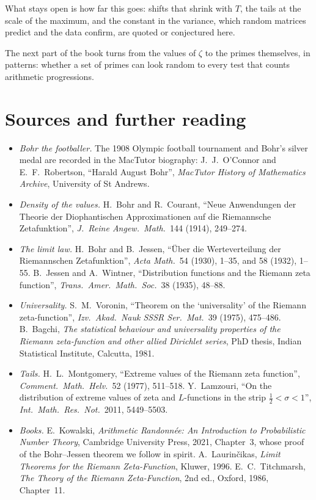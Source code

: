 What stays open is how far this goes: shifts that shrink with $T$, the tails at the scale of the maximum, and the constant in the variance, which random matrices predict and the data confirm, are quoted or conjectured here.

The next part of the book turns from the values of $\zeta$ to the primes themselves, in patterns: whether a set of primes can look random to every test that counts arithmetic progressions.

\section*{Sources and further reading}

\begin{itemize}
\item \emph{Bohr the footballer.} The 1908 Olympic football tournament and Bohr's silver medal are recorded in the MacTutor biography: J.~J.~O'Connor and E.~F.~Robertson, ``Harald August Bohr'', \emph{MacTutor History of Mathematics Archive}, University of St Andrews.
\item \emph{Density of the values.} H.~Bohr and R.~Courant, ``Neue Anwendungen der Theorie der Diophantischen Approximationen auf die Riemannsche Zetafunktion'', \emph{J.\ Reine Angew.\ Math.}\ 144 (1914), 249--274.
\item \emph{The limit law.} H.~Bohr and B.~Jessen, ``Über die Werteverteilung der Riemannschen Zetafunktion'', \emph{Acta Math.}\ 54 (1930), 1--35, and 58 (1932), 1--55. B.~Jessen and A.~Wintner, ``Distribution functions and the Riemann zeta function'', \emph{Trans.\ Amer.\ Math.\ Soc.}\ 38 (1935), 48--88.
\item \emph{Universality.} S.~M.~Voronin, ``Theorem on the `universality' of the Riemann zeta-function'', \emph{Izv.\ Akad.\ Nauk SSSR Ser.\ Mat.}\ 39 (1975), 475--486. B.~Bagchi, \emph{The statistical behaviour and universality properties of the Riemann zeta-function and other allied Dirichlet series}, PhD thesis, Indian Statistical Institute, Calcutta, 1981.
\item \emph{Tails.} H.~L.~Montgomery, ``Extreme values of the Riemann zeta function'', \emph{Comment.\ Math.\ Helv.}\ 52 (1977), 511--518. Y.~Lamzouri, ``On the distribution of extreme values of zeta and $L$-functions in the strip $\frac12<\sigma<1$'', \emph{Int.\ Math.\ Res.\ Not.}\ 2011, 5449--5503.
\item \emph{Books.} E.~Kowalski, \emph{Arithmetic Randonnée: An Introduction to Probabilistic Number Theory}, Cambridge University Press, 2021, Chapter~3, whose proof of the Bohr--Jessen theorem we follow in spirit. A.~Laurinčikas, \emph{Limit Theorems for the Riemann Zeta-Function}, Kluwer, 1996. E.~C.~Titchmarsh, \emph{The Theory of the Riemann Zeta-Function}, 2nd ed., Oxford, 1986, Chapter~11.

\end{itemize}

